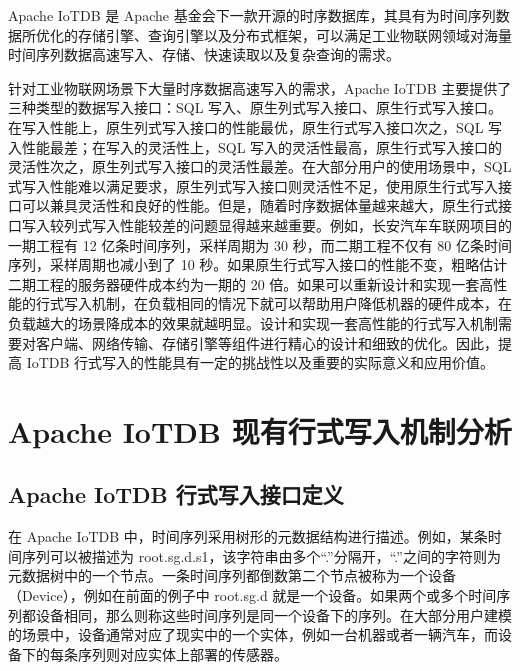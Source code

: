 Apache IoTDB 是 Apache 基金会下一款开源的时序数据库，其具有为时间序列数据所优化的存储引擎、查询引擎以及分布式框架，可以满足工业物联网领域对海量时间序列数据高速写入、存储、快速读取以及复杂查询的需求\cite{wang2023apache}。

针对工业物联网场景下大量时序数据高速写入的需求，Apache IoTDB 主要提供了三种类型的数据写入接口：SQL 写入、原生列式写入接口、原生行式写入接口。在写入性能上，原生列式写入接口的性能最优，原生行式写入接口次之，SQL 写入性能最差；在写入的灵活性上，SQL 写入的灵活性最高，原生行式写入接口的灵活性次之，原生列式写入接口的灵活性最差。在大部分用户的使用场景中，SQL 式写入性能难以满足要求，原生列式写入接口则灵活性不足，使用原生行式写入接口可以兼具灵活性和良好的性能。但是，随着时序数据体量越来越大，原生行式接口写入较列式写入性能较差的问题显得越来越重要。例如，长安汽车车联网项目的一期工程有 12 亿条时间序列，采样周期为 30 秒，而二期工程不仅有 80 亿条时间序列，采样周期也减小到了 10 秒。如果原生行式写入接口的性能不变，粗略估计二期工程的服务器硬件成本约为一期的 20 倍。如果可以重新设计和实现一套高性能的行式写入机制，在负载相同的情况下就可以帮助用户降低机器的硬件成本，在负载越大的场景降成本的效果就越明显。设计和实现一套高性能的行式写入机制需要对客户端、网络传输、存储引擎等组件进行精心的设计和细致的优化。因此，提高 IoTDB 行式写入的性能具有一定的挑战性以及重要的实际意义和应用价值。
\section{Apache IoTDB 现有行式写入机制分析\label{sec:chap1-sec2}}
\subsection{Apache IoTDB 行式写入接口定义}
在 Apache IoTDB 中，时间序列采用树形的元数据结构进行描述。例如，某条时间序列可以被描述为 root.sg.d.s1，该字符串由多个“.”分隔开，“.”之间的字符则为元数据树中的一个节点。一条时间序列都倒数第二个节点被称为一个设备（Device），例如在前面的例子中 root.sg.d 就是一个设备。如果两个或多个时间序列都设备相同，那么则称这些时间序列是同一个设备下的序列。在大部分用户建模的场景中，设备通常对应了现实中的一个实体，例如一台机器或者一辆汽车，而设备下的每条序列则对应实体上部署的传感器。

